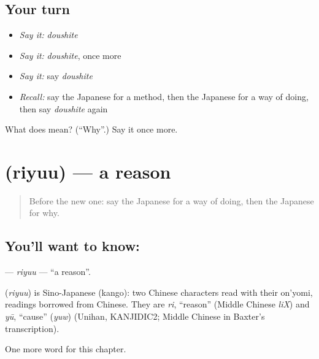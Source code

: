 \subsection*{Your turn}
\begin{itemize}
\raggedright
  \item \emph{Say it:} \emph{doushite}
  \item \emph{Say it:} \emph{doushite}, once more
  \item \emph{Say it:} say \emph{doushite}
  \item \emph{Recall:} say the Japanese for a method, then the Japanese for a way of doing, then say \emph{doushite} again
\end{itemize}

\begin{tcolorbox}[breakable,colback=teal!4,colframe=teal!35!black,title={Before you move on}]
What does  mean? (\textquotedblleft{}Why\textquotedblright{}.) Say it once more.
\end{tcolorbox}
\section[\texorpdfstring{\ja{りゆう} (riyuu)}{りゆう (riyuu)}]{ (riyuu) — a reason}

\label{lesson:JA-C98-riyuu}



\begin{quote}
Before the new one: say the Japanese for a way of doing, then the Japanese for why.
\end{quote}

\subsection*{You'll want to know: }
\textbf{} — \emph{riyuu} — \textquotedblleft{}a reason\textquotedblright{}.

\begin{cousinweb}
\textbf{} (\emph{riyuu}) is Sino-Japanese (kango): two Chinese characters read with their on'yomi, readings borrowed from Chinese. They are \emph{ri}, \textquotedblleft{}reason\textquotedblright{} (Middle Chinese \emph{liX}) and \emph{yū}, \textquotedblleft{}cause\textquotedblright{} (\emph{yuw}) (Unihan, KANJIDIC2; Middle Chinese in Baxter's transcription).
\end{cousinweb}

\begin{grammarlens}[title={What you've built}]
One more word for this chapter.
\end{grammarlens}

